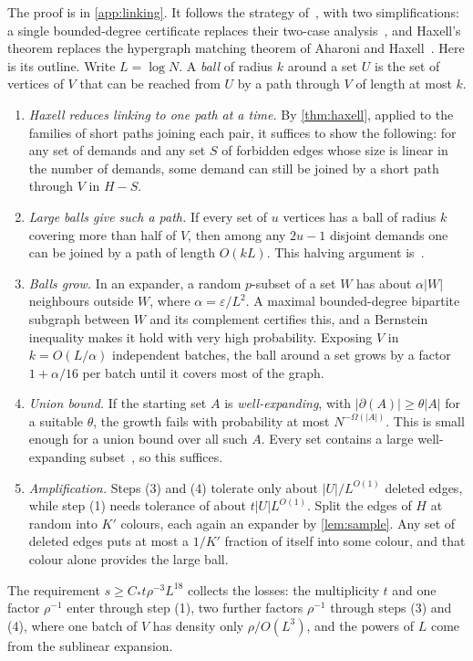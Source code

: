 \documentclass[11pt]{article}
\theoremstyle{definition}
\theoremstyle{remark}
\numberwithin{equation}{section}
\numberwithin{figure}{section}
\numberwithin{table}{section}
\newcommand{\eps}{\varepsilon}
\newcommand{\NN}{\partial}
\begin{document}
The proof is in \cref{app:linking}. It follows the strategy of~\cite{BM}, with
two simplifications: a single bounded-degree certificate replaces their
two-case analysis~\cite[Proposition~13]{BM}, and Haxell's theorem replaces the
hypergraph matching theorem of Aharoni and Haxell~\cite{AH}. Here is its
outline. Write $L=\log N$. A \emph{ball} of radius $k$ around a set $U$ is the
set of vertices of $V$ that can be reached from $U$ by a path through $V$ of
length at most $k$.
\begin{enumerate}[label=(\arabic*),itemsep=2pt]
\item \emph{Haxell reduces linking to one path at a time.} By
\cref{thm:haxell}, applied to the families of short paths joining each pair, it
suffices to show the following: for any set of demands and any set $S$ of
forbidden edges whose size is linear in the number of demands, some demand can
still be joined by a short path through $V$ in $H-S$.
\item \emph{Large balls give such a path.} If every set of $u$ vertices has a
ball of radius $k$ covering more than half of $V$, then among any $2u-1$
disjoint demands one can be joined by a path of length $O(kL)$. This halving
argument is~\cite[Proposition~8]{BM}.
\item \emph{Balls grow.} In an expander, a random $p$-subset of a set $W$ has
about $\alpha|W|$ neighbours outside $W$, where $\alpha=\eps/L^2$. A maximal
bounded-degree bipartite subgraph between $W$ and its complement certifies
this, and a Bernstein inequality makes it hold with very high probability.
Exposing $V$ in $k=O(L/\alpha)$ independent batches, the ball around a set
grows by a factor $1+\alpha/16$ per batch until it covers most of the graph.
\item \emph{Union bound.} If the starting set $A$ is \emph{well-expanding},
with $|\NN(A)|\ge\theta|A|$ for a suitable $\theta$, the growth fails with
probability at most $N^{-\Omega(|A|)}$. This is small enough for a union bound
over all such $A$. Every set contains a large well-expanding
subset~\cite[Proposition~18]{BM}, so this suffices.
\item \emph{Amplification.} Steps (3) and (4) tolerate only about $|U|/L^{O(1)}$
deleted edges, while step (1) needs tolerance of about $t|U|L^{O(1)}$. Split the
edges of $H$ at random into $K'$ colours, each again an expander by
\cref{lem:sample}. Any set of deleted edges puts at most a $1/K'$ fraction of
itself into some colour, and that colour alone provides the large ball.
\end{enumerate}
The requirement $s\ge C_*t\rho^{-3}L^{18}$ collects the losses: the
multiplicity $t$ and one factor $\rho^{-1}$ enter through step (1), two further
factors $\rho^{-1}$ through steps (3) and (4), where one batch of $V$ has density
only $\rho/O(L^3)$, and the powers of $L$ come from the sublinear expansion.
\end{document}
